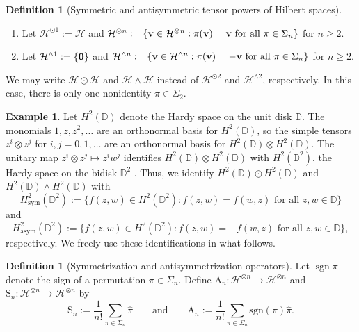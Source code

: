 \documentclass[10pt,reqno]{amsart}
\newcommand{\0}{{\color{lightgray}0}}
\newcommand{\A}{\mathrm{A}}
\renewcommand{\S}{\mathrm{S}}
\newcommand{\D}{\mathbb{D}}
\renewcommand{\geq}{\geqslant}
\newcommand{\h}{\mathcal{H}}
\renewcommand{\hat}{\widehat}
\renewcommand{\vec}[1]{{\bf #1}}
\theoremstyle{definition}
\newtheorem{Definition}[equation]{Definition}
\newtheorem{Example}[equation]{Example}
\numberwithin{equation}{section}
\begin{document}
\begin{Definition}[Symmetric and antisymmetric tensor powers of Hilbert spaces]\hfill
\begin{enumerate}
\item Let $\h^{\odot 1} :=\h$ and
$\h^{\odot n} :=\{ \vec{v} \in \h^{\otimes n}: \text{$\pi(\vec{v})= \vec{v}$ for all $\pi \in \Sigma_n$} \}$
for $n \geq 2$.

\item Let $\h^{\wedge 1} := \{ \vec{0}\}$ and
$\h^{\wedge n} :=\{ \vec{v} \in \h^{\wedge n}: \text{$\pi(\vec{v})= -\vec{v}$ for all $\pi \in \Sigma_n$} \}$
for $n \geq 2$.
\end{enumerate}
\end{Definition}

We may write $\h \odot \h$ and $\h \wedge \h$ instead of $\h^{\odot 2}$ and $\h^{\wedge 2}$, respectively.
In this case, there is only one nonidentity $\pi \in \Sigma_2$.

\begin{Example}\label{Example:Hardy}
Let $H^2(\D)$ denote the Hardy space on the unit disk $\D$.
The monomials $1,z,z^2,\ldots$ are an orthonormal basis for $H^2(\D)$,
so the simple tensors $z^i \otimes z^j$ for $i,j=0,1,\ldots$ are an orthonormal basis for
$H^2(\D) \otimes H^2(\D)$.
The unitary map $z^i \otimes z^j \mapsto z^i w^j$ identifies $H^2(\D) \otimes H^2(\D)$ with $H^2(\D^2)$,
the Hardy space on the bidisk $\D^2$ \cite{bidisk1}.
Thus, we identify $H^2(\D) \odot H^2(\D)$ and $H^2(\D) \wedge H^2(\D)$ with
\begin{equation}\label{eq:H2Sym}
H^2_{\operatorname{sym}}(\D^2) := \{  f(z,w) \in H^2(\D^2) : \text{$f(z,w) =  f(w,z)$ for all $z,w \in \D$} \}
\end{equation}
and
\begin{equation}\label{eq:H2Anti}
H^2_{\operatorname{asym}}(\D^2) := \{  f(z,w) \in H^2(\D^2) : \text{$f(z,w) = - f(w,z)$ for all $z,w \in \D$} \},
\end{equation}
respectively.
We freely use these identifications in what follows.  
\end{Example}


\begin{Definition}[Symmetrization and antisymmetrization operators]
Let $\operatorname{sgn}\pi$ denote the sign of a permutation $\pi \in \Sigma_n$.
Define $\A_n: \h^{\otimes n} \to \h^{\otimes n}$ and $\S_n: \h^{\otimes n}\to\h^{\otimes n}$ by 
\begin{equation}\label{eq:SnAn}
\S_{n}:=\frac{1}{n !} \sum_{\pi \in \Sigma_{n}} \hat{\pi}
\qquad \text{and} \qquad
\A_{n}:=\frac{1}{n !} \sum_{\pi \in \Sigma_{n}}\text{sgn}({\pi}) \hat{\pi}.
\end{equation}
\end{Definition}
\end{document}
